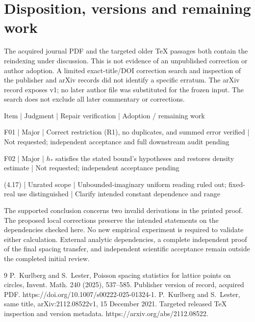 \documentclass[10pt]{article}
\begin{document}
\section*{Disposition, versions and remaining work}
The acquired journal PDF and the targeted older TeX passages both contain the reindexing under discussion. This is not evidence of an unpublished correction or author adoption. A limited exact-title/DOI correction search and inspection of the publisher and arXiv records did not identify a specific erratum. The arXiv record exposes v1; no later author file was substituted for the frozen input. The search does not exclude all later commentary or corrections.\par
Item | Judgment | Repair verification | Adoption / remaining work\par
F01 | Major | Correct restriction (R1), no duplicates, and summed error verified | Not requested; independent acceptance and full downstream audit pending\par
F02 | Major | \(h_*\) satisfies the stated bound’s hypotheses and restores density estimate | Not requested; independent acceptance pending\par
(4.17) | Unrated scope | Unbounded-imaginary uniform reading ruled out; fixed-real use distinguished | Clarify intended constant dependence and range\par
The supported conclusion concerns two invalid derivations in the printed proof. The proposed local corrections preserve the intended statements on the dependencies checked here. No new empirical experiment is required to validate either calculation. External analytic dependencies, a complete independent proof of the final spacing transfer, and independent scientific acceptance remain outside the completed initial review.\par
9 P. Kurlberg and S. Lester, Poisson spacing statistics for lattice points on circles, Invent. Math. 240 (2025), 537–585. Publisher version of record, acquired PDF. https://doi.org/10.1007/s00222-025-01324-1. P. Kurlberg and S. Lester, same title, arXiv:2112.08522v1, 15 December 2021. Targeted released TeX inspection and version metadata. https://arxiv.org/abs/2112.08522.\par
\end{document}
